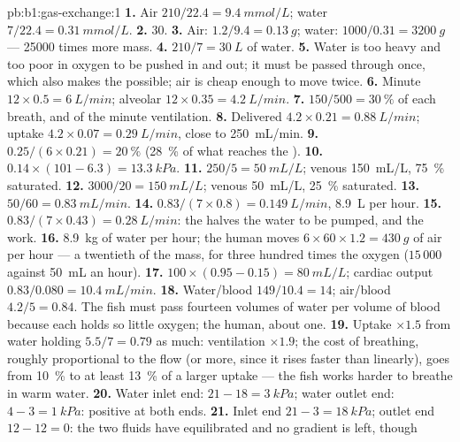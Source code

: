 \begin{solution}{pb:b1:gas-exchange:1}
\textbf{1.} Air $210/22.4 = \qty{9.4}{mmol/L}$; water $7/22.4 =
\qty{0.31}{mmol/L}$.
\textbf{2.} 30.
\textbf{3.} Air: $1.2/9.4 = \qty{0.13}{g}$; water: $1000/0.31 =
\qty{3200}{g}$ --- \num{25000} times more mass.
\textbf{4.} $210/7 = \qty{30}{L}$ of water.
\textbf{5.} Water is too heavy and too poor in oxygen to be pushed
in and out; it must be passed through once, which also makes the
 possible; air is cheap enough to move twice.
\textbf{6.} Minute $12\times 0.5 = \qty{6}{L/min}$; alveolar
$12\times 0.35 = \qty{4.2}{L/min}$.
\textbf{7.} $150/500 = \qty{30}{\%}$ of each breath, and of the minute ventilation.
\textbf{8.} Delivered $4.2\times 0.21 = \qty{0.88}{L/min}$; uptake
$4.2\times 0.07 = \qty{0.29}{L/min}$, close to \qty{250}{mL/min}.
\textbf{9.} $0.25/(6\times 0.21) = \qty{20}{\%}$ (\qty{28}{\%} of what
reaches the ).
\textbf{10.} $0.14\times(101 - 6.3) = \qty{13.3}{kPa}$.
\textbf{11.} $250/5 = \qty{50}{mL/L}$; venous \qty{150}{mL/L},
\qty{75}{\%} saturated.
\textbf{12.} $3000/20 = \qty{150}{mL/L}$; venous \qty{50}{mL/L},
\qty{25}{\%} saturated.
\textbf{13.} $50/60 = \qty{0.83}{mL/min}$.
\textbf{14.} $0.83/(7\times 0.8) = \qty{0.149}{L/min}$, \qty{8.9}{L}
per hour.
\textbf{15.} $0.83/(7\times 0.43) = \qty{0.28}{L/min}$: the
 halves the water to be pumped, and the work.
\textbf{16.} \qty{8.9}{kg} of water per hour; the human moves $6\times
60\times 1.2 = \qty{430}{g}$ of air per hour --- a twentieth of the
mass, for three hundred times the oxygen ($15\,000$ against
\qty{50}{mL} an hour).
\textbf{17.} $100\times(0.95 - 0.15) = \qty{80}{mL/L}$; cardiac output
$0.83/0.080 = \qty{10.4}{mL/min}$.
\textbf{18.} Water/blood $149/10.4 = 14$; air/blood $4.2/5 = 0.84$.
The fish must pass fourteen volumes of water per volume of blood
because each holds so little oxygen; the human, about one.
\textbf{19.} Uptake $\times 1.5$ from water holding $5.5/7 = 0.79$ as
much: ventilation $\times 1.9$; the cost of breathing, roughly
proportional to the flow (or more, since it rises faster than
linearly), goes from \qty{10}{\%} to at least \qty{13}{\%} of a larger
uptake --- the fish works harder to breathe in warm water.
\textbf{20.} Water inlet end: $21 - 18 = \qty{3}{kPa}$; water outlet
end: $4 - 3 = \qty{1}{kPa}$: positive at both ends.
\textbf{21.} Inlet end $21 - 3 = \qty{18}{kPa}$; outlet end $12 - 12 =
0$: the two fluids have equilibrated and no gradient is left, though

\end{solution}
